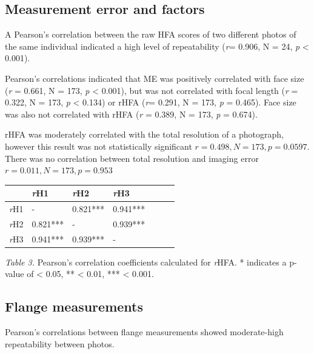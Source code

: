 \subsection{Measurement error and factors}

A Pearson's correlation between the raw HFA scores of two different photos of the same individual indicated a high level of repeatability (\textit{r}= 0.906, N = 24, \textit{p} < 0.001).

Pearson's correlations indicated that ME was positively correlated with face size (\textit{r} = 0.661, N = 173, \textit{p} < 0.001), but was not correlated with focal length  (\textit{r} = 0.322, N = 173, \textit{p} < 0.134) or rHFA (\textit{r}= 0.291, N = 173, \textit{p} = 0.465). Face size was also not correlated with rHFA (\textit{r} = 0.389, N = 173, \textit{p} = 0.674). 

rHFA was moderately correlated with the total resolution of a photograph, however this result was not statistically significant \(r = 0.498, N = 173, p=0.0597\). There was no correlation between total resolution and imaging error \(r = 0.011, N = 173, p=0.953\)

\begin{center}
\begin{tabular}{l l l l l l l}
\hline
\multirow{1}{*}{  } & \multirow{1}{*}{\textit{r}H1} & \multirow{1}{*}{\textit{r}H2} & \multirow{1}{*}{\textit{r}H3} \\ 
\hline
\textit{r}H1 & - & 0.821*** & 0.941***  \\

\textit{r}H2 & 0.821*** & - & 0.939*** \\

\textit{r}H3 & 0.941*** & 0.939*** & - \\
\hline 
\end{tabular}
\end{center}
\textit{Table 3.} Pearson's correlation coefficients calculated for \textit{r}HFA. * indicates a p-value of < 0.05, ** < 0.01, *** < 0.001.
\subsection{Flange measurements}

Pearson's correlations between flange measurements showed moderate-high repeatability between photos. 

